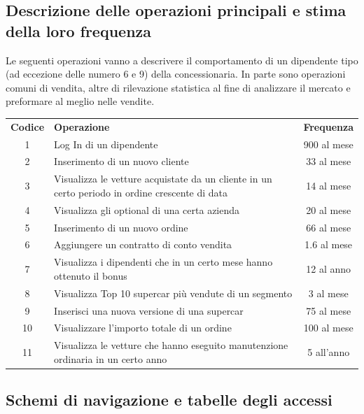 \documentclass[11pt]{article}
\begin{document}
\newpage

\subsection{Descrizione delle operazioni principali e stima della loro frequenza}

Le seguenti operazioni vanno a descrivere il comportamento di un dipendente tipo
(ad eccezione delle numero 6 e 9) della concessionaria. In parte sono operazioni
comuni di vendita, altre di rilevazione statistica al fine di analizzare il
mercato e preformare al meglio nelle vendite. 

\begin{table}[htbp]
    \centering
    \small
    \begin{tabularx}{\linewidth}{c X c}
      \rowcolor{red!20!}
      \textbf{Codice} & \textbf{Operazione} & \textbf{Frequenza} \\
      1 & Log In di un dipendente & 900 al mese \\
      2 & Inserimento di un nuovo cliente & 33 al mese \\
      3 & Visualizza le vetture acquistate da un cliente in un certo periodo in
      ordine crescente di data & 14 al mese \\
      4 & Visualizza gli optional di una certa azienda & 20 al mese \\
      5 & Inserimento di un nuovo ordine & 66 al mese \\
      6 & Aggiungere un contratto di conto vendita & 1.6 al mese \\
      7 & Visualizza i dipendenti che in un certo mese hanno ottenuto il bonus & 12
      al anno \\
      8 & Visualizza Top 10 supercar più vendute di un segmento & 3 al mese \\
      9 & Inserisci una nuova versione di una supercar & 75 al mese \\
      10 & Visualizzare l'importo totale di un ordine & 100 al mese \\
      11 & Visualizza le vetture che hanno eseguito manutenzione ordinaria in un
      certo anno & 5 all'anno \\
    \end{tabularx}
    \label{tab:tabella_frequenze}
\end{table}
\subsection{Schemi di navigazione e tabelle degli accessi}
\end{document}
